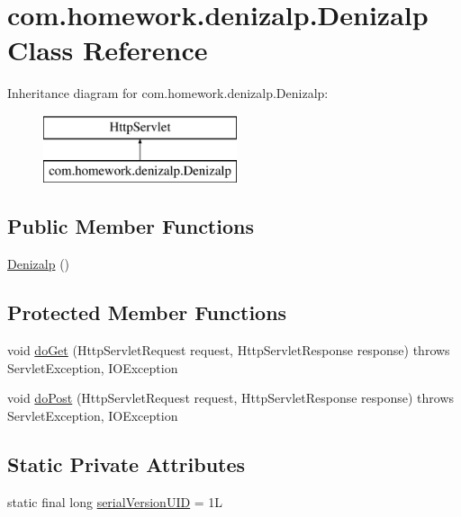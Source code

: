 \hypertarget{classcom_1_1homework_1_1denizalp_1_1_denizalp}{}\section{com.\+homework.\+denizalp.\+Denizalp Class Reference}
\label{classcom_1_1homework_1_1denizalp_1_1_denizalp}
Inheritance diagram for com.\+homework.\+denizalp.\+Denizalp\+:\begin{figure}[H]
\begin{center}
\leavevmode
\includegraphics[height=2.000000cm]{classcom_1_1homework_1_1denizalp_1_1_denizalp}
\end{center}
\end{figure}
\subsection*{Public Member Functions}
\begin{DoxyCompactItemize}
\item 
\hyperlink{classcom_1_1homework_1_1denizalp_1_1_denizalp_ae15225067faa1f6a5a42555e8e46d98e}{Denizalp} ()
\end{DoxyCompactItemize}
\subsection*{Protected Member Functions}
\begin{DoxyCompactItemize}
\item 
void \hyperlink{classcom_1_1homework_1_1denizalp_1_1_denizalp_a5ceb5e4e159bae7b8486d97db7ac8379}{do\+Get} (Http\+Servlet\+Request request, Http\+Servlet\+Response response)  throws Servlet\+Exception, I\+O\+Exception 
\item 
void \hyperlink{classcom_1_1homework_1_1denizalp_1_1_denizalp_a2e582edb3c13a703341214349460c0bf}{do\+Post} (Http\+Servlet\+Request request, Http\+Servlet\+Response response)  throws Servlet\+Exception, I\+O\+Exception 
\end{DoxyCompactItemize}
\subsection*{Static Private Attributes}
\begin{DoxyCompactItemize}
\item 
static final long \hyperlink{classcom_1_1homework_1_1denizalp_1_1_denizalp_a0ba32279227f2b418ea1da8996859de8}{serial\+Version\+U\+ID} = 1L
\end{DoxyCompactItemize}



